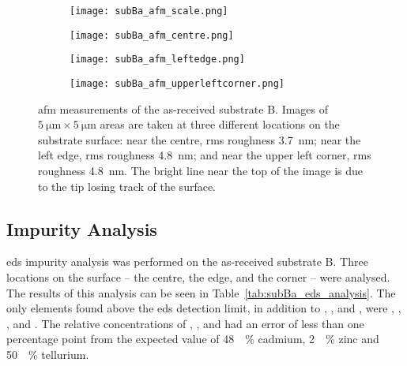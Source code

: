 \begin{figure}[htbp]
    \centering
    \begin{subfigure}[t]{0.03\linewidth}
    \centering
        \texttt{[image: subBa\_afm\_scale.png]}
        \caption{}\label{fig:subBa_afm_centre}
    \end{subfigure}
    \hfill
    \begin{subfigure}[t]{0.3\linewidth}
    \centering
        \texttt{[image: subBa\_afm\_centre.png]}
        \caption{}\label{fig:subBa_afm_centre}
    \end{subfigure}
    \hfill
    \begin{subfigure}[t]{0.3\linewidth}
    \centering
        \texttt{[image: subBa\_afm\_leftedge.png]}
        \caption{}\label{fig:subBa_afm_edge}
    \end{subfigure}
    \hfill
    \begin{subfigure}[t]{0.3\linewidth}
    \centering
        \texttt{[image: subBa\_afm\_upperleftcorner.png]}
        \caption{}\label{fig:subBa_afm_corner}
    \end{subfigure}
    \caption[\Ac{afm} of as-received substrate B.]{\Acf{afm} measurements of the as-received substrate B. Images of $\SI{5}{\micro\metre}\times\SI{5}{\micro\metre}$ areas are taken at three different locations on the substrate surface:  near the centre, \ac{rms} roughness \SI{3,7}{\nano\metre};  near the left edge, \ac{rms} roughness \SI{4,8}{\nano\metre}; and  near the upper left corner, \ac{rms} roughness \SI{4,8}{\nano\metre}. The bright line near the top of the image is due to the tip losing track of the surface.}\label{fig:subBa_afm}
\end{figure} %


\subsection{Impurity Analysis}

\Ac{eds} impurity analysis was performed on the as-received substrate B. Three locations on the surface -- the centre, the edge, and the corner -- were analysed. The results of this analysis can be seen in Table~\ref{tab:subBa_eds_analysis}. The only elements found above the \ac{eds} detection limit, in addition to , , and , were , , , and . The relative concentrations of , , and  had an error of less than one percentage point from the expected value of \SI{48}{\atomic\percent} cadmium, \SI{2}{\atomic\percent} zinc and \SI{50}{\atomic\percent} tellurium.

